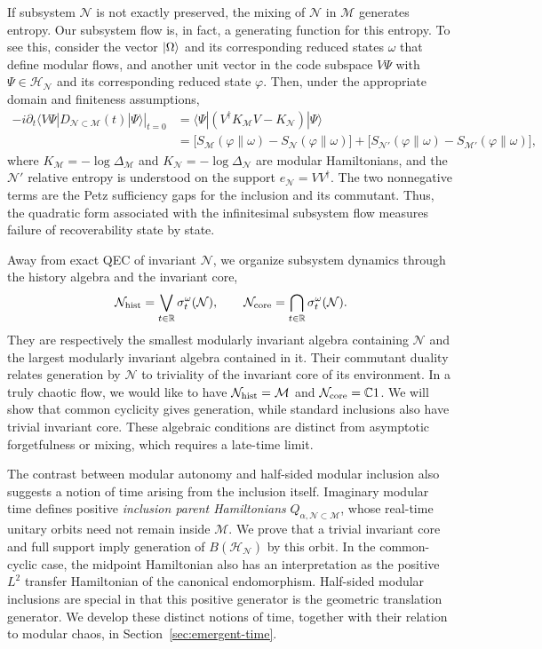 \documentclass[a4paper,11pt]{article}
\theoremstyle{definition}
\newcommand{\mN}{\mathcal{N}}
\newcommand{\mH}{\mathcal{H}}
\newcommand{\mM}{\mathcal{M}}
\begin{document}
If subsystem $\mN$ is not exactly preserved, the mixing of $\mN$ in $\mM$ generates entropy. Our subsystem flow is, in fact, a generating function for this entropy. To see this, consider the vector $\ket{\Omega}$ and its corresponding reduced states $\omega$ that define modular flows, and another unit vector in the code subspace $V\Psi$ with $\Psi\in\mH_{\mN}$ and its corresponding reduced state $\varphi$. Then, under the appropriate domain and finiteness assumptions,
\begin{align}
 -i\left.
 \partial_t
 \langle V\Psi|D_{\mN\subset\mM}(t)|\Psi\rangle
 \right|_{t=0}
 &=
 \langle\Psi|(V^\dagger K_{\mM}V-K_{\mN})|\Psi\rangle
 \nonumber\\
 &=
 \bigl[
 S_{\mM}(\varphi\|\omega)-S_{\mN}(\varphi\|\omega)
 \bigr]
 +
 \bigl[
 S_{\mN'}(\varphi\|\omega)-S_{\mM'}(\varphi\|\omega)
 \bigr],
 \label{eq:intro-entropy}
\end{align}
where $K_{\mM}=-\log\Delta_{\mM}$ and $K_{\mN}=-\log\Delta_{\mN}$ are modular Hamiltonians, and
 the $\mN'$ relative entropy is understood on the support $e_{\mN}=VV^\dagger$. The two nonnegative terms are the Petz sufficiency gaps for the inclusion and its commutant. Thus, the quadratic form associated with the infinitesimal subsystem flow measures failure of recoverability state by state.

Away from exact QEC of invariant $\mN$, we organize subsystem dynamics through the history algebra and the invariant core,
\begin{equation}
    \mN_{\rm hist}
    =
    \bigvee_{t\in\mathbb R}\sigma_t^\omega(\mN),
    \qquad
    \mN_{\rm core}
    =
    \bigcap_{t\in\mathbb R}\sigma_t^\omega(\mN).
\end{equation}
They are respectively the smallest modularly invariant algebra containing $\mN$ and the largest modularly invariant algebra contained in it. Their commutant duality relates generation by $\mN$ to triviality of the invariant core of its environment. In a truly chaotic flow, we would like to have $\mN_{\rm hist}=\mM$ and $\mN_{\rm core}=\mathbb C1$. We will show that common cyclicity gives generation, while standard inclusions also have trivial invariant core. These algebraic conditions are distinct from asymptotic forgetfulness or mixing, which requires a late-time limit.

The contrast between modular autonomy and half-sided modular inclusion also
suggests a notion of time arising from the inclusion itself.  Imaginary
modular time defines positive \emph{inclusion parent Hamiltonians}
$Q_{\alpha,\mN\subset\mM}$, whose real-time unitary orbits need not remain
inside $\mM$.  We prove that a trivial invariant core and full support
imply generation of $B(\mH_{\mN})$ by this orbit.  In the common-cyclic
case, the midpoint Hamiltonian also has an interpretation as the positive
$L^2$ transfer Hamiltonian of the canonical endomorphism.  Half-sided
modular inclusions are special in that this positive generator is the
geometric translation generator.  We develop these distinct notions of
time, together with their relation to modular chaos, in
Section~\ref{sec:emergent-time}.
\end{document}
